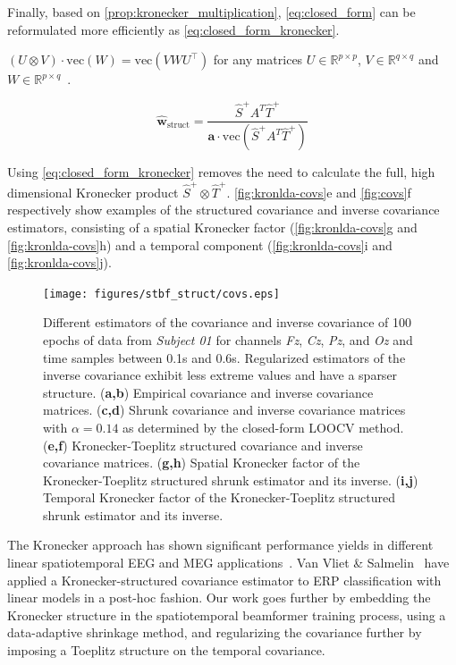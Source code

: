 	Finally, based on \autoref{prop:kronecker_multiplication},
	\autoref{eq:closed_form} can be reformulated more efficiently as
	\autoref{eq:closed_form_kronecker}.
	\begin{property}
		$(U\otimes V)\cdot\text{vec}(W) = \text{vec}(VWU^\intercal)$
		for any matrices $U\in\mathbb{R}^{p\times p}$,
		$V\in\mathbb{R}^{q\times q}$ and $W\in\mathbb{R}^{p\times q}$~\cite{Loan2000}.
		\label{prop:kronecker_multiplication}
	\end{property}

	\begin{equation}
		\hat{\mathbf{w}}_\text{struct} =
		\frac{\hat{S}^+A^T\hat{T}^+}
		{\mathbf{a}\cdot\text{vec}(\hat{S}^+A^T\hat{T}^+)}
		\label{eq:closed_form_kronecker}
	\end{equation}

	Using \autoref{eq:closed_form_kronecker} removes the need to calculate the full, high dimensional Kronecker product $\hat{S}^+\otimes
		\hat{T}^+$.
	\autoref{fig:kronlda-covs}e and \autoref{fig:covs}f respectively show examples of the
	structured covariance and inverse covariance estimators,
	consisting of a spatial Kronecker factor (\autoref{fig:kronlda-covs}g and
	\autoref{fig:kronlda-covs}h) and a temporal component (\autoref{fig:kronlda-covs}i and
	\autoref{fig:kronlda-covs}j).

	\begin{figure}
		\texttt{[image: figures/stbf\_struct/covs.eps]}
		\caption{Different estimators of the covariance and inverse covariance
			of 100 epochs of data from \textit{Subject 01} for channels
			\textit{Fz}, \textit{Cz}, \textit{Pz}, and \textit{Oz} and time samples between 0.1s and 0.6s.
			Regularized estimators of the inverse covariance exhibit less extreme values and have a sparser structure.
			(\textbf{a,b}) Empirical covariance and inverse covariance matrices.
			(\textbf{c,d}) Shrunk covariance and inverse covariance matrices with $\alpha=0.14$ as
			determined by the closed-form LOOCV method. (\textbf{e,f}) Kronecker-Toeplitz
			structured covariance and inverse covariance matrices.
			(\textbf{g,h}) Spatial Kronecker factor of the Kronecker-Toeplitz structured shrunk estimator and its inverse.
			(\textbf{i,j}) Temporal Kronecker factor of the Kronecker-Toeplitz structured shrunk estimator and its inverse.}
		\label{fig:kronlda-covs}
	\end{figure}

	The Kronecker approach has shown significant performance yields in different linear spatiotemporal EEG and MEG
	applications~\cite{DeMunck2002,Huizenga2002,Beltrachini2013,GonzalezNavarro2016,GonzalezNavarro2017}.
	Van Vliet \& Salmelin~\cite{Vliet2020} have applied a Kronecker-structured covariance estimator to ERP classification with linear models in a post-hoc fashion.
	Our work goes further by embedding the Kronecker structure in the
	spatiotemporal beamformer training process, using a data-adaptive shrinkage
	method, and regularizing the covariance further by imposing a Toeplitz
	structure on the temporal covariance.

